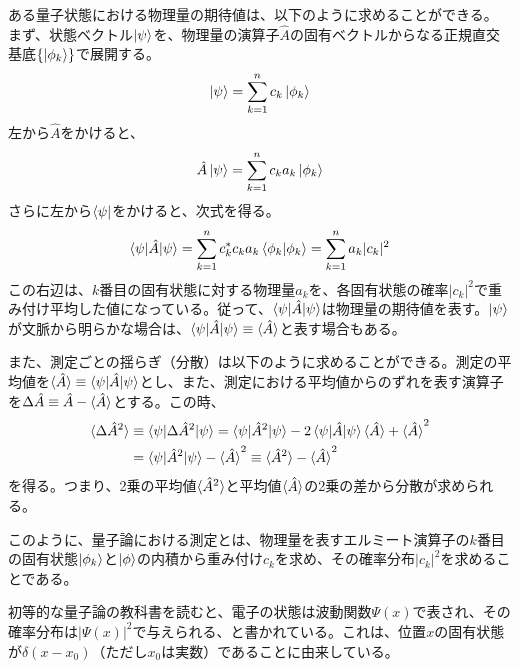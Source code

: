 ある量子状態における物理量の期待値は、以下のように求めることができる。
まず、状態ベクトル$\ket\psi$を、物理量の演算子$\hat A$の固有ベクトルからなる正規直交基底$\{\ket{\phi_k}\}$で展開する。
\begin{equation}
  \ket \psi = \sum_{k=1}^n c_k\ket{\phi_k}
\end{equation}
左から$\hat A$をかけると、
\begin{equation}
  \hat A\ket{\psi} = \sum_{k=1}^n c_k a_k\ket{\phi_k}
\end{equation}
さらに左から$\bra\psi$をかけると、次式を得る。
\begin{equation}
  \braket{\psi|\hat A|\psi} = \sum_{k=1}^n c_k^* c_k a_k\braket{\phi_k|\phi_k} = \sum_{k=1}^n a_k|c_k|^2
\end{equation}
この右辺は、$k$番目の固有状態に対する物理量$a_k$を、各固有状態の確率$|c_k|^2$で重み付け平均した値になっている。従って、$\braket{\psi|\hat A|\psi}$は物理量の期待値を表す。$\ket \psi$が文脈から明らかな場合は、$\braket{\psi|\hat A|\psi} \equiv \braket{\hat A}$と表す場合もある。

また、測定ごとの揺らぎ（分散）は以下のように求めることができる。測定の平均値を$\braket {\hat A} \equiv \braket{\psi | \hat A | \psi}$とし、また、測定における平均値からのずれを表す演算子を$\Delta \hat A \equiv \hat A - \braket {\hat A}$とする。この時、
\begin{equation}
\begin{aligned}
  \braket{\Delta \hat A^2} &\equiv 
  \braket{\psi|\Delta \hat A^2|\psi}
  =\braket{\psi|\hat A^2|\psi} - 2\braket{\psi |\hat A|\psi}\braket {\hat A} + \braket{\hat A}^2\\
  &= \braket{\psi|\hat A^2|\psi} - \braket{\hat A}^2 
  \equiv \braket{\hat A^2} - \braket{\hat A}^2
\end{aligned}
\end{equation}
を得る。つまり、2乗の平均値$\braket{\hat A^2}$と平均値$\braket{\hat A}$の2乗の差から分散が求められる。

このように、量子論における測定とは、物理量を表すエルミート演算子の$k$番目の固有状態$\ket {\phi_k}$と$\ket \phi$の内積から重み付け$c_k$を求め、その確率分布$|c_k|^2$を求めることである。

初等的な量子論の教科書を読むと、電子の状態は波動関数$\Psi(x)$で表され、その確率分布は$|\Psi(x)|^2$で与えられる、と書かれている。これは、位置$x$の固有状態が$\delta(x - x_0)$（ただし$x_0$は実数）であることに由来している。



